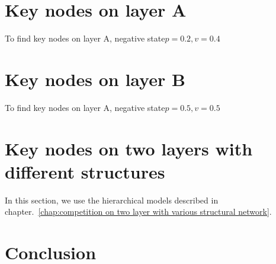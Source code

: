\section{Key nodes on layer A}
To find key nodes on layer A, negative state$p=0.2, v=0.4$


\section{Key nodes on layer B}
To find key nodes on layer A, negative state$p=0.5, v=0.5$


\section{Key nodes on two layers with different structures}
In this section, we use the hierarchical models described in chapter.~\ref{chap:competition on two layer with various structural network}. 

\section{Conclusion}
